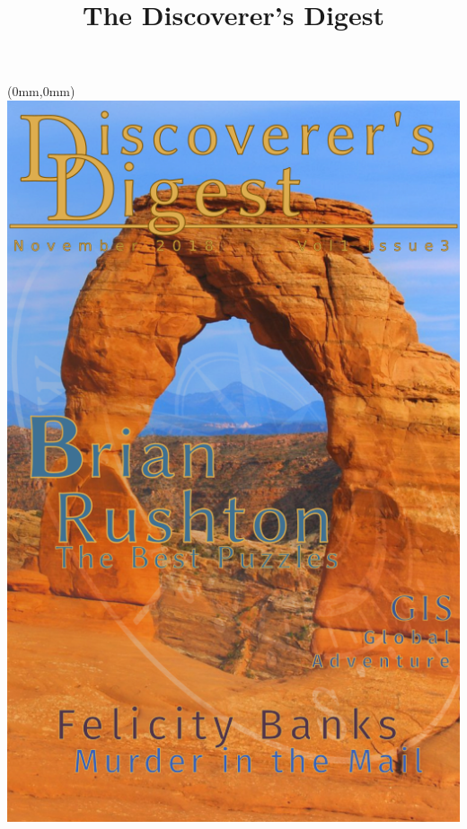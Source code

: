 \documentclass[11.75pt,openany,final]{memoir}
\title{The Discoverer's Digest}
\begin{document}

\chapter*{}

\begin{textblock*}{70.9mm}(0mm,0mm)
\includegraphics[width=\paperwidth]{./media/images/nov_cover.png}
\end{textblock*}
\thispagestyle{empty}\clearpage %
\end{document}
